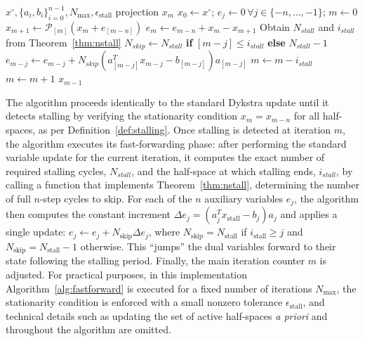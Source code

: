 \begin{algorithm}
\caption{Dykstra's projection algorithm for polyhedral sets with fast forwarding.}
\label{alg:fastforward}
\begin{algorithmic}[1]
    \Inputs $x^\circ, \{a_i, b_i\}_{i=0}^{n-1}, N_{\max}, \epsilon_{\text{stall}}$
    \Outputs projection $x_m$
        \State $x_0 \leftarrow x^\circ$; $e_j \leftarrow 0\,\forall j\in\lbrace -n,\dots,-1\rbrace$;  $m \leftarrow 0$ 
            \State $x_{m+1} \leftarrow \mathcal{P}_{[m]}(x_m + e_{[m-n]})$
            \State $e_{m} \leftarrow e_{m-n} + x_m - x_{m+1}$
            \label{alg:start} 
                \State Obtain $N_{stall}$ and $i_{stall}$ from Theorem~\ref{thm:nstall}
                    \State $N_{skip}\leftarrow N_{stall}$ \textbf{if} $[m-j]\leq i_{stall}$ \textbf{else} $N_{stall}-1$
                    \State $e_{m-j} \leftarrow e_{m-j} + N_{skip}(a_{[m-j]}^T x_{m-j} - b_{[m-j]})a_{[m-j]}$
                \EndFor
                \State $m \leftarrow m - i_{stall}$\label{alg:end}
            \Else
                \State $m \leftarrow m + 1$
            \EndIf
        \EndWhile
        \State \Return $x_{m-1}$
\end{algorithmic}
\end{algorithm}

The algorithm proceeds identically to the standard Dykstra update until it detects stalling by verifying the stationarity condition $x_m = x_{m-n}$ for all half-spaces, as per Definition~\ref{def:stalling}. Once stalling is detected at iteration $m$, the algorithm executes its fast-forwarding phase: after performing the standard variable update for the current iteration, it computes the exact number of required stalling cycles, $N_{stall}$, and the half-space at which stalling ends, $i_{stall}$, by calling a function that implements Theorem~\ref{thm:nstall}, determining the number of full $n$-step cycles to skip. For each of the $n$ auxiliary variables $e_j$, the algorithm then computes the constant increment $\Delta e_j = (a_j^T x_{\text{stall}} - b_j)a_j$ and applies a single update: $e_j \leftarrow e_j + N_{\text{skip}} \Delta e_j$, where $N_{\text{skip}}=N_{\text{stall}}$ if $i_{\text{stall}}\geq j$ and $N_{\text{skip}}=N_{\text{stall}}-1$ otherwise. This ``jumps'' the dual variables forward to their state following the stalling period. Finally, the main iteration counter $m$ is adjusted. For practical purposes, in this implementation Algorithm~\ref{alg:fastforward} is executed for a fixed number of iterations $N_{\text{max}}$, the stationarity condition is enforced with a small nonzero tolerance $\epsilon_{\text{stall}}$, and technical details such as updating the set of active half-spaces \textit{a priori} and throughout the algorithm are omitted.

